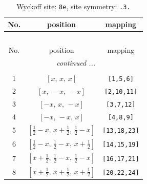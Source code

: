 \documentclass[fleqn,8pt]{jsarticle}
\begin{document}
\renewcommand{\arraystretch}{1.2}
\begin{longtable}{ccc}
\caption{Wyckoff site: {\tt 8e}, site symmetry: {\tt .3.}}
 \\
 \hline \hline
No. & position & mapping \\ \hline \endfirsthead

\multicolumn{2}{l}{\tablename\ \thetable{}} \\
 \hline \hline
No. & position & mapping \\ \hline \endhead

 \hline \hline
\multicolumn{2}{r}{\footnotesize\it continued ...} \\ \endfoot

 \hline \hline
\multicolumn{2}{r}{} \\ \endlastfoot

1 & $\left[ x,\, x,\, x \right]$ & {\tt [1,5,6]} \\ \hline
2 & $\left[ x,\, - x,\, - x \right]$ & {\tt [2,10,11]} \\ \hline
3 & $\left[ - x,\, x,\, - x \right]$ & {\tt [3,7,12]} \\ \hline
4 & $\left[ - x,\, - x,\, x \right]$ & {\tt [4,8,9]} \\ \hline
5 & $\left[ \frac{1}{2} - x,\, x + \frac{1}{2},\, \frac{1}{2} - x \right]$ & {\tt [13,18,23]} \\ \hline
6 & $\left[ \frac{1}{2} - x,\, \frac{1}{2} - x,\, x + \frac{1}{2} \right]$ & {\tt [14,15,19]} \\ \hline
7 & $\left[ x + \frac{1}{2},\, \frac{1}{2} - x,\, \frac{1}{2} - x \right]$ & {\tt [16,17,21]} \\ \hline
8 & $\left[ x + \frac{1}{2},\, x + \frac{1}{2},\, x + \frac{1}{2} \right]$ & {\tt [20,22,24]} \\
\end{longtable}
\renewcommand{\arraystretch}{1.2}
\end{document}
